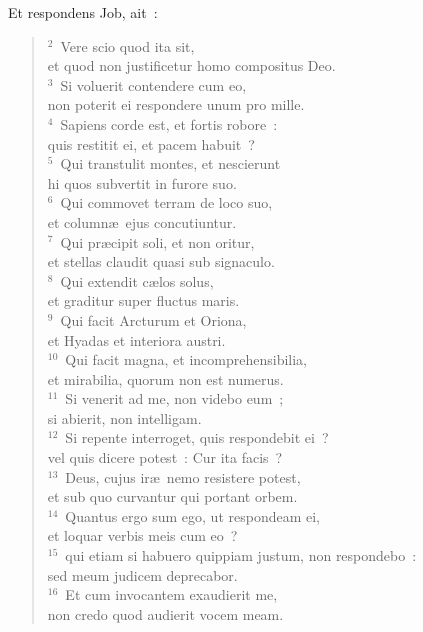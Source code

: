 \lettrine[lines=3,image=true,loversize=0.05,lraise=-0.03]{E}{}t respondens Job, ait~:
\begin{flushleft}\begin{verse}\vspace{6pt}${}^{2}$~Vere scio quod ita sit,\\ et quod non justificetur homo compositus Deo.\\
${}^{3}$~Si voluerit contendere cum eo,\\ non poterit ei respondere unum pro mille.\\
${}^{4}$~Sapiens corde est, et fortis robore~:\\ quis restitit ei, et pacem habuit~?\\
${}^{5}$~Qui transtulit montes, et nescierunt\\ hi quos subvertit in furore suo.\\
${}^{6}$~Qui commovet terram de loco suo,\\ et column\ae\ ejus concutiuntur.\\
${}^{7}$~Qui pr\ae cipit soli, et non oritur,\\ et stellas claudit quasi sub signaculo.\\
${}^{8}$~Qui extendit c\ae los solus,\\ et graditur super fluctus maris.\\
${}^{9}$~Qui facit Arcturum et Oriona,\\ et Hyadas et interiora austri.\\
${}^{10}$~Qui facit magna, et incomprehensibilia,\\ et mirabilia, quorum non est numerus.\\
${}^{11}$~Si venerit ad me, non videbo eum~;\\ si abierit, non intelligam.\\
${}^{12}$~Si repente interroget, quis respondebit ei~?\\ vel quis dicere potest~: Cur ita facis~?\\
${}^{13}$~Deus, cujus ir\ae\ nemo resistere potest,\\ et sub quo curvantur qui portant orbem.\\
${}^{14}$~Quantus ergo sum ego, ut respondeam ei,\\ et loquar verbis meis cum eo~?\\
${}^{15}$~qui etiam si habuero quippiam justum, non respondebo~:\\ sed meum judicem deprecabor.\\
${}^{16}$~Et cum invocantem exaudierit me,\\ non credo quod audierit vocem meam.\\

\end{verse}
\end{flushleft}

